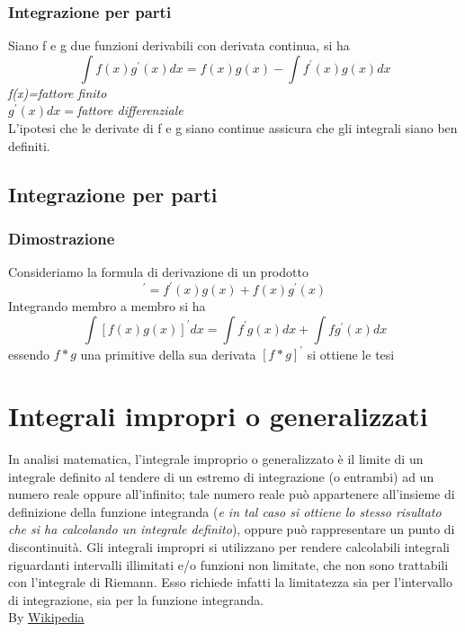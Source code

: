 \subsubsection{Integrazione per parti}
Siano f e g due funzioni derivabili con derivata continua, si ha
\begin{equation*}
	\int f(x)g^\prime(x)dx=f(x)g(x)-\int f^\prime (x)g(x)dx
\end{equation*}
\textit{f(x)=fattore finito}\\
$g^\prime(x)dx=$\textit{fattore differenziale}\\
L'ipotesi che le derivate di f e g siano continue assicura che gli integrali siano ben definiti.
\subsection{Integrazione per parti}
\subsubsection{Dimostrazione}
Consideriamo la formula di derivazione di un prodotto
\begin{equation*}
	[f(x)g(x)]^\prime=f^\prime (x)g(x)+f(x)g^\prime(x)
\end{equation*}
Integrando membro a membro si ha
\begin{equation*}
	\int [f(x)g(x)]^\prime dx=\int f^\prime g(x)dx+\int f g^\prime(x)dx
\end{equation*}
essendo $f*g$ una primitive della sua derivata $[f*g]^\prime$ si ottiene le tesi 

\section{Integrali impropri o generalizzati}
In analisi matematica, l'integrale improprio o generalizzato è il limite di un integrale definito al tendere di un estremo di integrazione (o entrambi) ad un numero reale oppure all'infinito; tale numero reale può appartenere all'insieme di definizione della funzione integranda (\textit{e in tal caso si ottiene lo stesso risultato che si ha calcolando un integrale definito}), oppure può rappresentare un punto di discontinuità. Gli integrali impropri si utilizzano per rendere calcolabili integrali riguardanti intervalli illimitati e/o funzioni non limitate, che non sono trattabili con l'integrale di Riemann. Esso richiede infatti la limitatezza sia per l'intervallo di integrazione, sia per la funzione integranda.\\ By \href{https://it.wikipedia.org/wiki/Integrale_improprio}{Wikipedia}
